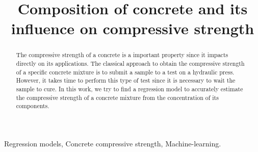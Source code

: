 \documentclass[conference]{IEEEtran}
\begin{document}
\title{Composition of concrete and its influence on compressive strength\\
}

\author{
\and
{}
}

\maketitle

\begin{abstract}
The compressive strength of a concrete is a important property since it impacts directly on its applications. The classical approach to obtain the compressive strength of a specific concrete mixture is to submit a sample to a test on a hydraulic press. However, it takes time to perform this type of test since it is necessary to wait the sample to cure. In this work, we try to find a regression model to accurately estimate the compressive strength of a concrete mixture from the concentration of its components.
\end{abstract}

\begin{IEEEkeywords}
Regression models, Concrete compressive strength, Machine-learning.
\end{IEEEkeywords}
\end{document}
